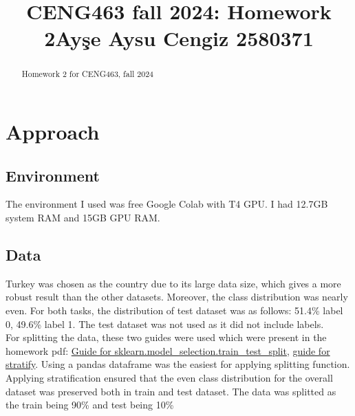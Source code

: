 \documentclass[
]{ceurart}
\begin{document}


\title{CENG463 fall 2024: Homework 2}

\title[mode=sub]{Ayşe Aysu Cengiz 2580371}




\begin{abstract}
Homework 2 for CENG463, fall 2024
\end{abstract}


\maketitle

\section{Approach}

\subsection{Environment}
The environment I used was free Google Colab with T4 GPU. I had 12.7GB system RAM and 15GB GPU RAM.



\subsection{Data}
Turkey was chosen as the country due to its large data size, which gives a more robust result than the other datasets. Moreover, the class distribution was nearly even. For both tasks, the distribution of test dataset was as follows: 51.4\% label 0, 49.6\% label 1. The test dataset was not used as it did not include labels.\\

For splitting the data, these two guides were used which were present in the homework pdf: \href{https://scikit-learn.org/1.5/modules/generated/sklearn.model_selection.train_test_split.html}{Guide for sklearn.model\_selection.train\_test\_split}, 
\href{https://stackoverflow.com/questions/34842405/parameter-stratify-from-method-train-test-split-scikit-learn}{guide for stratify}. Using a pandas dataframe was the easiest for applying splitting function. Applying stratification ensured that the even class distribution for the overall dataset was  preserved both in train and test dataset. The data was splitted as the train being 90\% and test being 10\%
\end{document}
